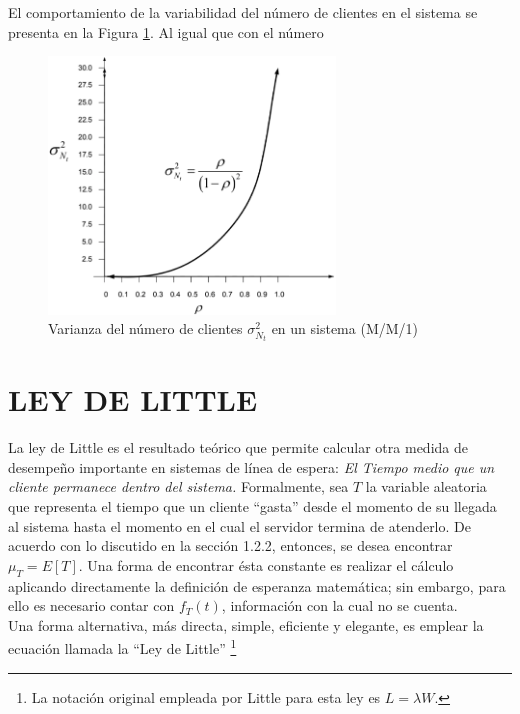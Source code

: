 El comportamiento de la variabilidad del número de clientes en el sistema se presenta en la Figura
\ref{fig:mesh8}. Al igual que con el número

\begin{figure}[H]
\centering
\includegraphics[width=3in]{chapters/chapter3/figures/Figura1-8:Varianzadelnumerodeclientesenunsistema.png}
\caption[Varianza del número de clientes $ \sigma_{N_{t}}^{2} $ en un sistema (M/M/1)]{Varianza del número de clientes $ \sigma_{N_{t}}^{2} $ en un sistema (M/M/1)}
\label{fig:mesh8}
\end{figure} 

\section{LEY DE LITTLE}
La ley de Little es el resultado teórico que permite calcular otra medida de desempeño importante en sistemas de línea de espera: {\em El Tiempo medio que un cliente permanece dentro del sistema. } Formalmente, sea $ T $ la variable aleatoria que representa el tiempo que un cliente “gasta” desde el momento de su llegada al sistema hasta el momento en el cual el servidor termina de atenderlo. De
acuerdo con lo discutido en la sección 1.2.2, entonces, se desea encontrar $ \mu_{T} = E \left[ T \right] $. Una forma de encontrar ésta constante es realizar el cálculo aplicando directamente la definición de esperanza matemática; sin embargo, para ello es necesario contar con $ f_{T}\left( t \right) $, información con la cual no se cuenta.
\\
Una forma alternativa, más directa, simple, eficiente y elegante, es emplear la ecuación llamada la “Ley de Little” \footnote{La notación original empleada por Little para esta ley es $ L=\lambda W. $}

